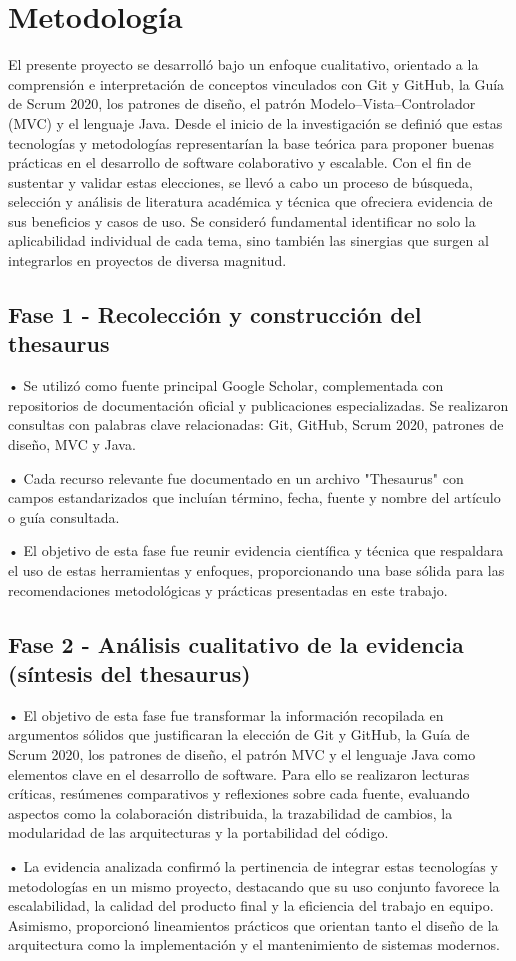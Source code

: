 \section{Metodología}
El presente proyecto se desarrolló bajo un enfoque cualitativo, orientado a la comprensión e interpretación de conceptos vinculados con Git y GitHub, la Guía de Scrum 2020, los patrones de diseño, el patrón Modelo–Vista–Controlador (MVC) y el lenguaje Java. Desde el inicio de la investigación se definió que estas tecnologías y metodologías representarían la base teórica para proponer buenas prácticas en el desarrollo de software colaborativo y escalable. Con el fin de sustentar y validar estas elecciones, se llevó a cabo un proceso de búsqueda, selección y análisis de literatura académica y técnica que ofreciera evidencia de sus beneficios y casos de uso. Se consideró fundamental identificar no solo la aplicabilidad individual de cada tema, sino también las sinergias que surgen al integrarlos en proyectos de diversa magnitud.

\subsection{Fase 1 - Recolección y construcción del thesaurus}
• Se utilizó como fuente principal Google Scholar, complementada con repositorios de documentación oficial y publicaciones especializadas. Se realizaron consultas con palabras clave relacionadas: Git, GitHub, Scrum 2020, patrones de diseño, MVC y Java.

• Cada recurso relevante fue documentado en un archivo "Thesaurus" con campos estandarizados que incluían término, fecha, fuente y nombre del artículo o guía consultada.

• El objetivo de esta fase fue reunir evidencia científica y técnica que respaldara el uso de estas herramientas y enfoques, proporcionando una base sólida para las recomendaciones metodológicas y prácticas presentadas en este trabajo.

\subsection{Fase 2 - Análisis cualitativo de la evidencia (síntesis del thesaurus)}
• El objetivo de esta fase fue transformar la información recopilada en argumentos sólidos que justificaran la elección de Git y GitHub, la Guía de Scrum 2020, los patrones de diseño, el patrón MVC y el lenguaje Java como elementos clave en el desarrollo de software. Para ello se realizaron lecturas críticas, resúmenes comparativos y reflexiones sobre cada fuente, evaluando aspectos como la colaboración distribuida, la trazabilidad de cambios, la modularidad de las arquitecturas y la portabilidad del código.

• La evidencia analizada confirmó la pertinencia de integrar estas tecnologías y metodologías en un mismo proyecto, destacando que su uso conjunto favorece la escalabilidad, la calidad del producto final y la eficiencia del trabajo en equipo. Asimismo, proporcionó lineamientos prácticos que orientan tanto el diseño de la arquitectura como la implementación y el mantenimiento de sistemas modernos.